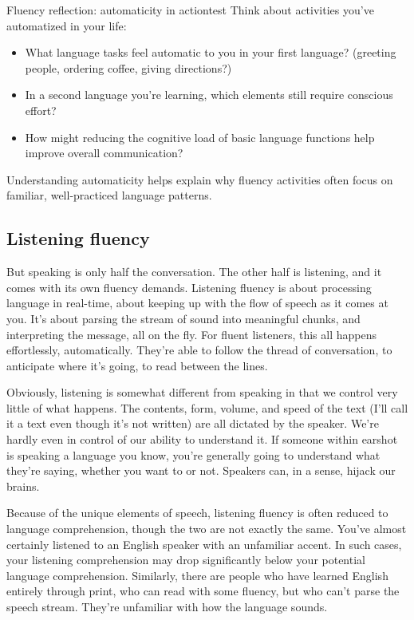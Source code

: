 \begin{tblsframedsymbol}{Fluency reflection: automaticity in action}{test}
Think about activities you've automatized in your life:
\begin{itemize}[noitemsep, leftmargin=*]
    \item What language tasks feel automatic to you in your first language? (greeting people, ordering coffee, giving directions?)
    \item In a second language you're learning, which elements still require conscious effort?
    \item How might reducing the cognitive load of basic language functions help improve overall communication?
\end{itemize}
Understanding automaticity helps explain why fluency activities often focus on familiar, well-practiced language patterns.
\end{tblsframedsymbol}

\subsection{Listening fluency}

But speaking is only half the conversation. The other half is listening, and it comes with its own fluency demands. Listening fluency is about processing language in real-time, about keeping up with the flow of speech as it comes at you. It's about parsing the stream of sound into meaningful chunks, and interpreting the message, all on the fly. For fluent listeners, this all happens effortlessly, automatically. They're able to follow the thread of conversation, to anticipate where it's going, to read between the lines.

Obviously, listening is somewhat different from speaking in that we control very little of what happens. The contents, form, volume, and speed of the text (I'll call it a text even though it's not written) are all dictated by the speaker. We're hardly even in control of our ability to understand it. If someone within earshot is speaking a language you know, you're generally going to understand what they're saying, whether you want to or not. Speakers can, in a sense, hijack our brains.

Because of the unique elements of speech, listening fluency is often reduced to language comprehension, though the two are not exactly the same. You've almost certainly listened to an English speaker with an unfamiliar accent. In such cases, your listening comprehension may drop significantly below your potential language comprehension. Similarly, there are people who have learned English entirely through print, who can read with some fluency, but who can't parse the speech stream. They're unfamiliar with how the language sounds.

